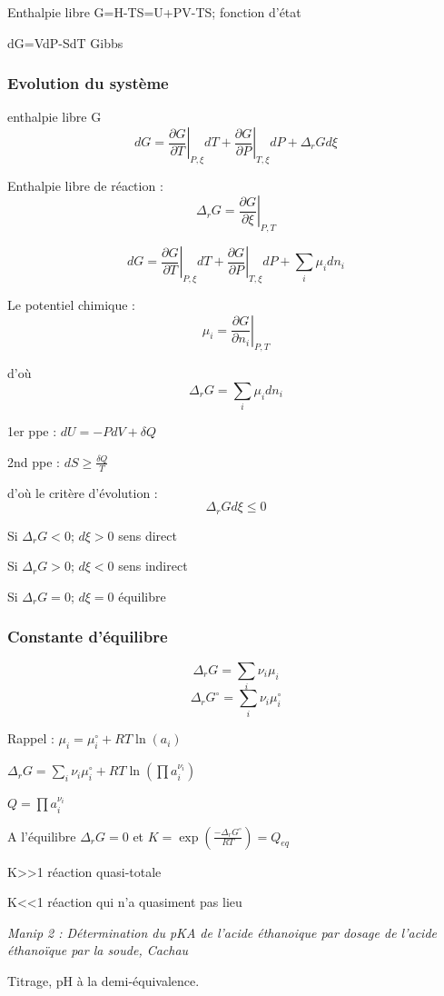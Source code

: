 \documentclass{article}%
\begin{document}
Enthalpie libre G=H-TS=U+PV-TS; fonction d'état

dG=VdP-SdT Gibbs

\subsubsection{Evolution du système}
enthalpie libre G \[dG=\left.\frac{\partial G}{\partial T}\right|_{P,\xi}dT + \left.\frac{\partial G}{\partial P}\right|_{T,\xi}dP+\Delta_r G d\xi\]

Enthalpie libre de réaction : \[\Delta_r G =\left.\frac{\partial G}{\partial \xi}\right|_{P,T}\]

\[dG=\left.\frac{\partial G}{\partial T}\right|_{P,\xi}dT + \left.\frac{\partial G}{\partial P}\right|_{T,\xi}dP + \sum_i \mu_i dn_i\]

Le potentiel chimique : \[\mu_i=\left.\frac{\partial G}{\partial n_i}\right|_{P,T}\]

d'où \[\Delta_r G = \sum_i \mu_i dn_i\]

1er ppe : $dU = -PdV +\delta Q$

2nd ppe : $dS \ge \frac{\delta Q}{T}$

d'où le critère d'évolution : \[\Delta_r G d\xi \le 0\]

Si $\Delta_r G < 0$; $d\xi>0$ sens direct

Si $\Delta_r G > 0$; $d\xi<0$ sens indirect

Si $\Delta_r G = 0$; $d\xi=0$ équilibre

\subsubsection{Constante d’équilibre}
\[\Delta_r G=\sum_i \nu_i\mu_i\]
\[\Delta_r G^\circ=\sum_i \nu_i\mu_i^\circ\]

Rappel : $\mu_i=\mu_i^\circ +RT\ln (a_i)$

$\Delta_r G=\sum_i \nu_i\mu_i^\circ+RT\ln (\prod a_i^{\nu_i})$

$Q=\prod a_i^{\nu_i}$

A l'équilibre $\Delta_r G = 0$ et $K=\exp \left(\frac{-\Delta_r G^\circ}{RT}\right)=Q_{eq}$

K>>1 réaction quasi-totale

K<<1 réaction qui n'a quasiment pas lieu

\textit{Manip 2 : Détermination du pKA de l’acide éthanoique par dosage de l’acide éthanoïque par la soude, Cachau}

Titrage, pH à la demi-équivalence.
\end{document}
